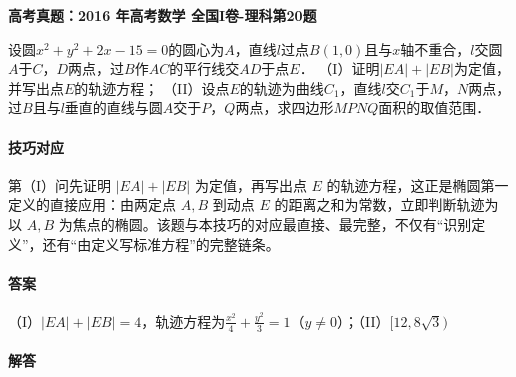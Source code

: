 \documentclass[UTF8,a4paper,11pt]{ctexart}
\newenvironment{gaokao}[1]{\par\medskip\noindent\textbf{高考真题：#1}\par\smallskip}{\par\medskip}
\begin{document}
\begin{gaokao}{2016 年高考数学 全国I卷-理科第20题}

设圆$x^2+y^2+2x-15=0$的圆心为$A$，直线$l$过点$B(1,0)$且与$x$轴不重合，$l$交圆$A$于$C$，$D$两点，过$B$作$AC$的平行线交$AD$于点$E$．
（I）证明$|EA|+|EB|$为定值，并写出点$E$的轨迹方程；
（II）设点$E$的轨迹为曲线$C_1$，直线$l$交$C_1$于$M$，$N$两点，过$B$且与$l$垂直的直线与圆$A$交于$P$，$Q$两点，求四边形$MPNQ$面积的取值范围．

\begin{center}


\end{center}

\paragraph{技巧对应}

第（I）问先证明 $|EA|+|EB|$ 为定值，再写出点 $E$ 的轨迹方程，这正是椭圆第一定义的直接应用：由两定点 $A,B$ 到动点 $E$ 的距离之和为常数，立即判断轨迹为以 $A,B$ 为焦点的椭圆。该题与本技巧的对应最直接、最完整，不仅有“识别定义”，还有“由定义写标准方程”的完整链条。

\paragraph{答案}

（I）$|EA|+|EB|=4$，轨迹方程为$\frac{x^2}{4}+\frac{y^2}{3}=1$（$y\neq0$）；（II）$[12,8\sqrt{3})$

\paragraph{解答}


\end{gaokao}
\end{document}
